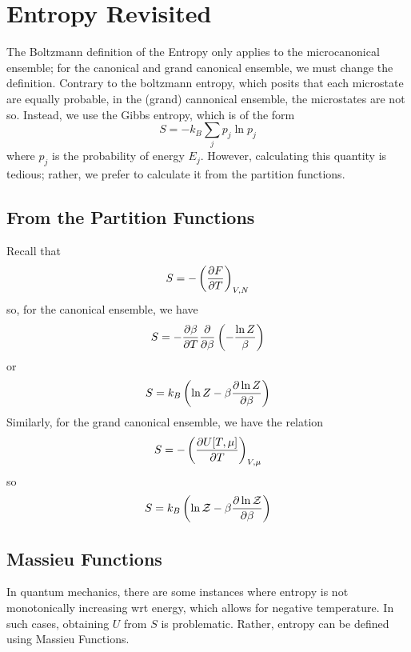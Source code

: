 \chapter{Entropy Revisited}
The Boltzmann definition of the Entropy only applies to the microcanonical ensemble; for the canonical and grand canonical ensemble, we must change the definition. Contrary to the boltzmann entropy, which posits that each microstate are equally probable, in the (grand) cannonical ensemble, the microstates are not so. Instead, we use the Gibbs entropy, which is of the form
\begin{equation}
	S = -k_B\sum_j p_j\ln p_j
\end{equation}
where \(p_j\) is the probability of energy \(E_j\). However, calculating this quantity is tedious; rather, we prefer to calculate it from the partition functions.

\section{From the Partition Functions}
Recall that
\[S = -\left(\frac{\partial F}{\partial T}\right)_{V,N}\]
so, for the canonical ensemble, we have
\[S = -\frac{\partial \beta}{\partial T} \frac{\partial }{\partial \beta}\left(-\frac{\ln Z}{\beta}\right)\]
or
\begin{equation}
	S = k_B\left(\ln Z - \beta \frac{\partial \ln Z}{\partial \beta}\right)
\end{equation}
Similarly, for the grand canonical ensemble, we have the relation
\begin{equation}
	S = -\left(\frac{\partial U[T,\mu]}{\partial T}\right)_{V,\mu}
\end{equation}
so
\begin{equation}
	S = k_B \left(\ln\mathcal Z - \beta \frac{\partial \ln \mathcal Z}{\partial \beta}\right)
\end{equation}

\section{Massieu Functions}
In quantum mechanics, there are some instances where entropy is not monotonically increasing wrt energy, which allows for negative temperature. In such cases, obtaining \(U\) from \(S\) is problematic. Rather, entropy can be defined using Massieu Functions.
